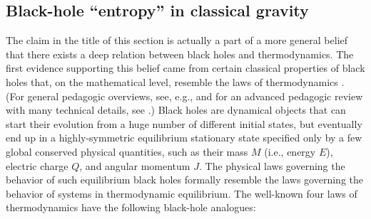 \documentclass[12pt]{article}
\begin{document}
\subsection{Black-hole ``entropy'' in classical gravity}

The claim in the title of this section
is actually a part of a more general belief that there exists 
a deep relation between black holes and thermodynamics. The first evidence 
supporting this belief came from certain classical properties of black holes
that, on the mathematical level, resemble the laws of thermodynamics 
\cite{beken,hawk2}. 
(For general pedagogic overviews, see, e.g., \cite{carrol,hawk3}
and for an advanced pedagogic review with many technical details, 
see \cite{town}.) Black holes are dynamical objects that can start
their evolution from a huge number of different initial states, 
but eventually end up in a highly-symmetric equilibrium stationary state 
specified only by a few global conserved physical quantities, 
such as their mass $M$ (i.e., energy $E$), electric charge $Q$, 
and angular momentum $J$. The physical laws governing the behavior
of such equilibrium black holes formally resemble the laws 
governing the behavior of systems in 
thermodynamic equilibrium. The well-known four laws of thermodynamics 
have the following black-hole analogues:
\end{document}
